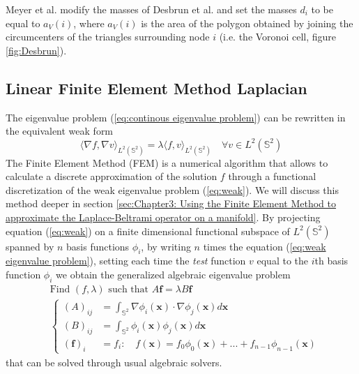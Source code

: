 Meyer et al. \cite{Meyer02discretedifferential-geometry} modify the masses of Desbrun et al. and set the masses $d_i$ to be equal to $a_{V}(i)$, where \(a_{V}(i)\) is the area of the polygon obtained by joining the circumcenters of the triangles surrounding node $i$ (i.e. the Voronoi cell, figure \ref{fig:Desbrun}).

\subsection{Linear Finite Element Method Laplacian}
The eigenvalue problem (\ref{eq:continous eigenvalue problem}) can be rewritten in the equivalent weak form
\begin{equation}\label{eq:weak}
	\langle \nabla f, \nabla v\rangle_{L^2(\mathbb S^2)} = \lambda \langle  f, v\rangle_{L^2(\mathbb S^2)} \quad \forall v \in L^2(\mathbb S^2)
\end{equation}
The Finite Element Method (FEM) is a numerical algorithm that allows to calculate a discrete approximation of the solution $f$ through a functional discretization of the weak eigenvalue problem (\ref{eq:weak}). We will discuss this method deeper in section \ref{sec:Chapter3: Using the Finite Element Method to approximate the Laplace-Beltrami operator on a manifold}. By projecting equation (\ref{eq:weak}) on a finite dimensional functional subspace of $L^2(\mathbb S^2)$ spanned by $n$ basis functions $\phi_i$, by writing $n$ times the equation (\ref{eq:weak eigenvalue problem}), setting each time the \textit{test} function $v$ equal to the $i$th basis function $\phi_i$ we obtain the generalized algebraic eigenvalue problem
$$
\begin{aligned}
&\text{Find }(f,\lambda)\text{ such that }A\mathbf f = \lambda B \mathbf f\\
&\begin{cases}
(A)_{ij} &= \int_{\mathbb S^2}\nabla \phi_i(\mathbf{x})\cdot \nabla \phi_j(\mathbf{x})d\mathbf{x}\\
(B)_{ij} &= \int_{\mathbb S^2} \phi_i(\mathbf{x}) \phi_j(\mathbf{x})d\mathbf{x}\\
(\mathbf f)_i &= f_i:\quad f(\mathbf x) = f_0\phi_0(\mathbf x)+ ... + f_{n-1}\phi_{n-1}(\mathbf x) 
\end{cases}
\end{aligned}
$$
that can be solved through usual algebraic solvers.

